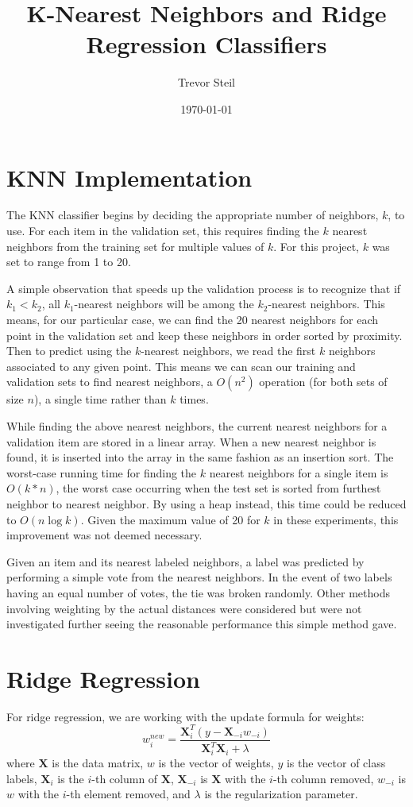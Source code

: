 \documentclass[11pt]{article}
\title{K-Nearest Neighbors and Ridge Regression Classifiers }
\date{\today}
\author{Trevor Steil}
\begin{document}
\maketitle

\section{KNN Implementation}
The KNN classifier begins by deciding the appropriate number of neighbors, $k$, to use. For each item in the validation set, this requires finding the
$k$ nearest neighbors from the training set for multiple values of $k$. For this project, $k$ was set to range from 1 to 20.

A simple observation that speeds up the validation process is to recognize that if $k_1 < k_2$, all $k_1$-nearest neighbors will be among the
$k_2$-nearest neighbors. This means, for our particular case, we can find the 20 nearest neighbors for each point in the validation set and keep these
neighbors in order sorted by proximity. Then to predict using the $k$-nearest neighbors, we read the first $k$ neighbors associated to any given
point. This means we can scan our training and validation sets to find nearest neighbors, a $O(n^2)$ operation (for both sets of size $n$), a single
time rather than $k$ times.

While finding the above nearest neighbors, the current nearest neighbors for a validation item are stored in a linear array. When a new nearest
neighbor is found, it is inserted into the array in the same fashion as an insertion sort. The worst-case running time for finding the $k$ nearest
neighbors for a single item is $O(k*n)$, the worst case occurring when the test set is sorted from furthest neighbor to nearest neighbor. By using a
heap instead, this time could be reduced to $O(n \log k)$. Given the maximum value of 20 for $k$ in these experiments, this improvement was not deemed
necessary.

Given an item and its nearest labeled neighbors, a label was predicted by performing a simple vote from the nearest neighbors. In the event of two
labels having an equal number of votes, the tie was broken randomly. Other methods involving weighting by the actual distances were considered but
were not investigated further seeing the reasonable performance this simple method gave.

\section{Ridge Regression}
For ridge regression, we are working with the update formula for weights:
\begin{equation*}
  w_i^{new} = \frac{\mathbf{X}_i^T (y - \mathbf{X}_{-i} w_{-i} )}{\mathbf{X}_i^T \mathbf{X}_i + \lambda}
\end{equation*}
where $\mathbf{X}$ is the data matrix, $w$ is the vector of weights, $y$ is the vector of class labels, $\mathbf{X}_i$ is the $i$-th column of $\mathbf{X}$, $\mathbf{X}_{-i}$ is
$\mathbf{X}$ with the $i$-th column removed, $w_{-i}$ is $w$ with the $i$-th element removed, and $\lambda$ is the regularization parameter.
\end{document}
